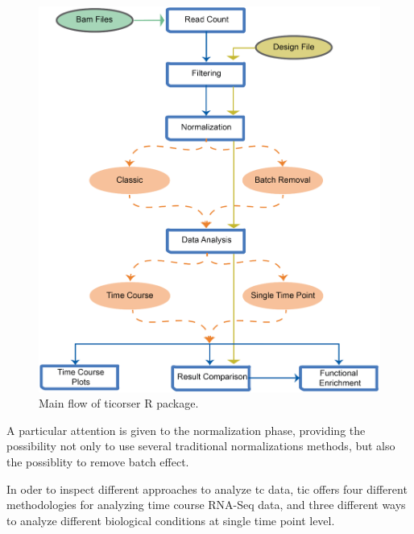 \begin{figure}[H]
\includegraphics[width=\textwidth,height=\textheight,keepaspectratio]{img/ticorser/main_flow.pdf}
\caption[ticorser mainflow]{Main flow of ticorser R package.}
\label{fig:ticorserflow}
\centering
\end{figure}
 
A particular attention is given to the normalization phase, providing the possibility not only to use several traditional normalizations methods, but also the possiblity to remove batch effect.

In oder to inspect different approaches to analyze \gls{tc} data, \gls{tic} offers four different methodologies for analyzing time course RNA-Seq data, and three different ways to analyze different biological conditions at single time point level.

